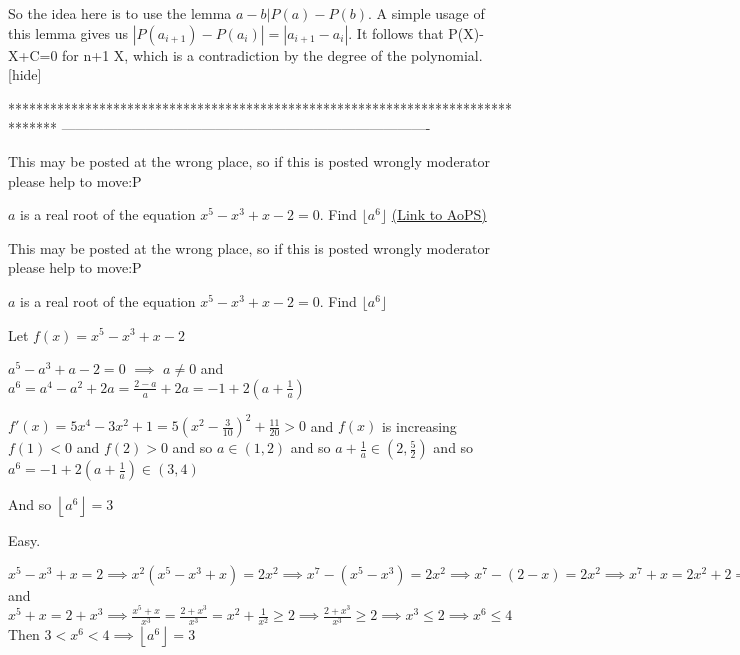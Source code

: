 \begin{solution} So the idea here is to use the lemma $a-b|P(a)-P(b)$. A simple usage of this lemma gives us $|{P(a_{i+1})-P(a_{i})}|=|{a_{i+1}-a_{i}}|$. It follows that P(X)-X+C=0 for n+1 X, which is a contradiction by the degree of the polynomial. [\/hide]
\end{solution}
*******************************************************************************
-------------------------------------------------------------------------------

\begin{problem}
	This may be posted at the wrong place, so if this is posted wrongly moderator please help to move:P

$a$ is a real root of the equation $x^5 - x^3 + x-2 = 0$. Find $\lfloor a^6\rfloor$
	\flushright \href{https://artofproblemsolving.com/community/c6h463498}{(Link to AoPS)}
\end{problem}



\begin{solution}
	\begin{tcolorbox}This may be posted at the wrong place, so if this is posted wrongly moderator please help to move:P

$a$ is a real root of the equation $x^5 - x^3 + x-2 = 0$. Find $\lfloor a^6\rfloor$\end{tcolorbox}
Let $f(x)=x^5-x^3+x-2$

$a^5-a^3+a-2=0$ $\implies$ $a\ne 0$ and $a^6=a^4-a^2+2a=\frac{2-a}a+2a=-1+2(a+\frac 1a)$

$f'(x)=5x^4-3x^2+1=5\left(x^2-\frac 3{10}\right)^2+\frac{11}{20}>0$ and $f(x)$ is increasing
$f(1)<0$ and $f(2)>0$ and so $a\in(1,2)$ and so $a+\frac 1a\in(2,\frac 52)$ and so $a^6=-1+2(a+\frac 1a)\in(3,4)$

And so $\boxed{\left\lfloor a^6\right\rfloor=3}$
\end{solution}



\begin{solution}
	Easy.

$x^5-x^3+x=2\implies x^2(x^5-x^3+x)=2x^2\implies x^7-(x^5-x^3)=2x^2\implies x^7-(2-x)=2x^2\implies x^7+x=2x^2+2\implies x(x^6+1)=2(x^2+1)>2\cdot 2x\implies x^6+1>4\implies x^6>3$ 
and  $x^5+x=2+x^3\implies \frac{x^5+x}{x^3}=\frac{2+x^3}{x^3}=x^2+\frac{1}{x^2}\geq 2\implies \frac{2+x^3}{x^3}\geq 2\implies x^3\leq 2\implies x^6\leq 4$ 
Then $3<x^6<4\implies \boxed{\left\lfloor a^{6}\right\rfloor=3} $
\end{solution}



